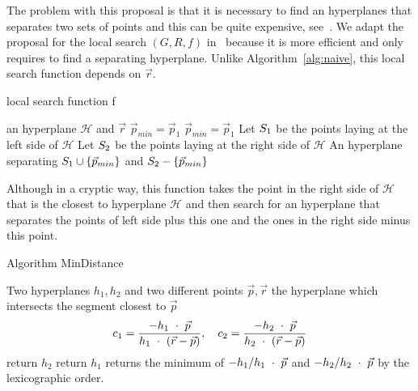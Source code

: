 \documentclass{article}
\newcommand{\cH}{\mathcal{H}}
\begin{document}
The problem with this proposal is that it is necessary to find an
hyperplanes that separates two sets of points and this can be quite
expensive, see~\cite{Elizondo06}. 
We adapt the proposal for the local search $(G, R, f)$ 
in~\cite{SleumerMsc} because it is more efficient and only requires to
find a separating hyperplane. Unlike Algorithm~\ref{alg:naive}, this
local search function depends on $\vec{r}$.
\begin{algorithm}
  \caption{local search function f}
  \label{alg:sleumer}
  \begin{algorithmic}
  \REQUIRE an hyperplane $\cH$ and $\vec{r}$
  \STATE $\vec{p}_{min}=\vec{p}_1$
  \IF{$\vec{p}_k$==$MinDistance(\vec{p}_{min}, \vec{p}_k,\cH,\vec{r})$}
  \STATE $\vec{p}_{min}=\vec{p}_1$
  \ENDIF
  \ENDFOR
  \STATE Let $S_1$ be the points laying at the left side of $\cH$ 
  \STATE Let $S_2$ be the points laying at the right side of $\cH$
  \RETURN An hyperplane separating $S_1\cup \{\vec{p}_{min}\}$ and 
  $S_2 - \{\vec{p}_{min}\}$
  \end{algorithmic}
\end{algorithm}
Although in a   cryptic way, this function takes the point in the right
side of $\cH$ that is the closest to hyperplane $\cH$ and then search
for an hyperplane that separates the points of left side plus this
one and the ones in the right side minus this point.
\begin{algorithm}
  \caption{Algorithm MinDistance}
  \begin{algorithmic}
  \REQUIRE Two hyperplanes $h_1,h_2$ and two different points $\vec{p},\vec{r}$
  \ENSURE the hyperplane which intersects the segment closest to $\vec{p}$ 
  \STATE
  \begin{equation*}
    c_1=\frac{-h_1\ \cdot \ \vec{p}}{h_1\ \cdot \ (\vec{r}-\vec{p})},
    \quad c_2=\frac{-h_2\ \cdot \ \vec{p}}{h_2\ \cdot \ (\vec{r}-\vec{p})}
  \end{equation*}
  \STATE return $h_2$
  \STATE return $h_1$
  \ELSE
  \STATE returns the minimum of $-h_1/h_1\ \cdot \ \vec{p}$ and 
  $-h_2/h_2\ \cdot \ \vec{p}$ by the lexicographic order.
  \ENDIF
  \end{algorithmic}
\end{algorithm} 


\end{document}
